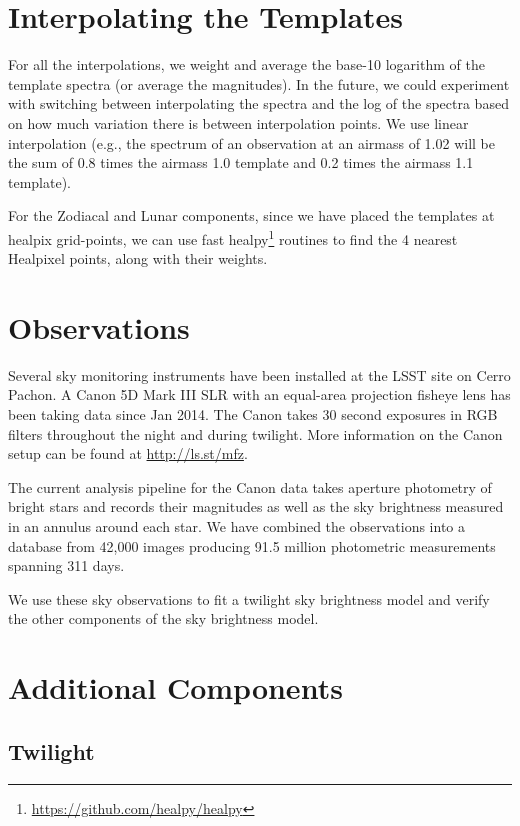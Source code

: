 \documentclass[]{spie}
\begin{document}
\section{Interpolating the Templates}\label{sec:interp}

For all the interpolations, we weight and average the base-10 logarithm of the template spectra (or average the magnitudes).  In the future, we could experiment with switching between interpolating the spectra and the log of the spectra based on how much variation there is between interpolation points.  We use linear interpolation (e.g., the spectrum of an observation at an airmass of 1.02 will be the sum of 0.8 times the airmass 1.0 template and 0.2 times the airmass 1.1 template). 

For the Zodiacal and Lunar components, since we have placed the templates at healpix grid-points, we can use fast healpy\footnote{\url{https://github.com/healpy/healpy}} routines to find the 4 nearest Healpixel points, along with their weights.  


\section{Observations}\label{sec:obs}

Several sky monitoring instruments have been installed at the LSST site on Cerro Pachon.  A Canon 5D Mark III SLR with an equal-area projection fisheye lens has been taking data since Jan 2014.  The Canon takes 30 second exposures in RGB filters throughout the night and during twilight.  More information on the Canon setup can be found at \url{http://ls.st/mfz}.

The current analysis pipeline for the Canon data takes aperture photometry of bright stars and records their magnitudes as well as the sky brightness measured in an annulus around each star.  We have combined the observations into a database from 42,000 images producing 91.5 million photometric measurements spanning 311 days.  

We use these sky observations to fit a twilight sky brightness model and verify the other components of the sky brightness model.

\section{Additional Components}\label{sec:twi}
\subsection{Twilight}
\end{document}
